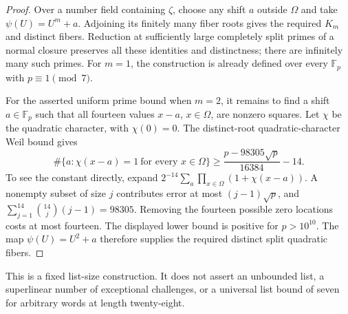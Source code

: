 \begin{proof}
Over a number field containing $\zeta$, choose any shift $a$ outside
$\Omega$ and take $\psi(U)=U^m+a$.  Adjoining its finitely many fiber roots
gives the required $K_m$ and distinct fibers.  Reduction at sufficiently
large completely split primes of a normal closure preserves all these
identities and distinctness; there are infinitely many such primes.
For $m=1$, the construction is already defined over every
$\mathbb F_p$ with $p\equiv1\pmod7$.

For the asserted uniform prime bound when $m=2$, it remains to find a shift
$a\in\mathbb F_p$ such that all fourteen values $x-a$, $x\in\Omega$, are
nonzero squares.  Let $\chi$ be the quadratic character, with $\chi(0)=0$.
The distinct-root quadratic-character Weil bound
\cite[Lemma~2.1]{kim-yip-yoo-tuples} gives
\[
 \#\{a:\chi(x-a)=1\ \text{for every }x\in\Omega\}
 \geq \frac{p-98305\sqrt p}{16384}-14.
\]
To see the constant directly, expand
$2^{-14}\sum_a\prod_{x\in\Omega}(1+\chi(x-a))$.
A nonempty subset of size $j$ contributes error at most
$(j-1)\sqrt p$, and
$\sum_{j=1}^{14}\binom{14}{j}(j-1)=98305$.
Removing the fourteen possible zero locations costs at most fourteen.
The displayed lower bound is positive for $p>10^{10}$.
The map $\psi(U)=U^2+a$ therefore supplies the required distinct split
quadratic fibers.
\end{proof}

This is a fixed list-size construction.  It does not assert an unbounded
list, a superlinear number of exceptional challenges, or a universal
list bound of seven for arbitrary words at length twenty-eight.
